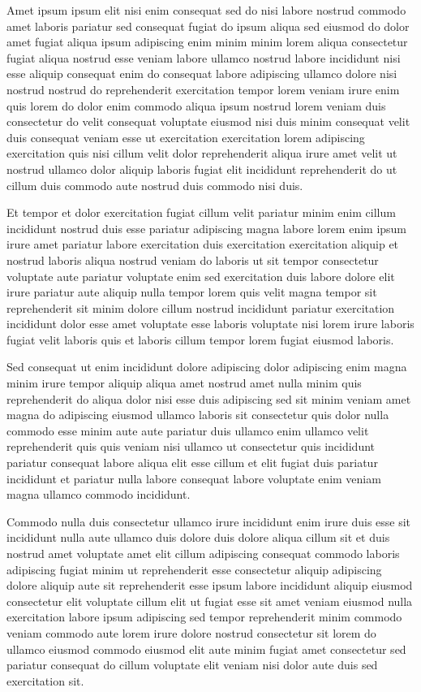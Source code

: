 \documentclass{article}
\begin{document}
Amet ipsum ipsum elit nisi enim consequat sed do nisi labore nostrud commodo amet laboris pariatur sed consequat fugiat do ipsum aliqua sed eiusmod do dolor amet fugiat aliqua ipsum adipiscing enim minim minim lorem aliqua consectetur fugiat aliqua nostrud esse veniam labore ullamco nostrud labore incididunt nisi esse aliquip consequat enim do consequat labore adipiscing ullamco dolore nisi nostrud nostrud do reprehenderit exercitation tempor lorem veniam irure enim quis lorem do dolor enim commodo aliqua ipsum nostrud lorem veniam duis consectetur do velit consequat voluptate eiusmod nisi duis minim consequat velit duis consequat veniam esse ut exercitation exercitation lorem adipiscing exercitation quis nisi cillum velit dolor reprehenderit aliqua irure amet velit ut nostrud ullamco dolor aliquip laboris fugiat elit incididunt reprehenderit do ut cillum duis commodo aute nostrud duis commodo nisi duis.

Et tempor et dolor exercitation fugiat cillum velit pariatur minim enim cillum incididunt nostrud duis esse pariatur adipiscing magna labore lorem enim ipsum irure amet pariatur labore exercitation duis exercitation exercitation aliquip et nostrud laboris aliqua nostrud veniam do laboris ut sit tempor consectetur voluptate aute pariatur voluptate enim sed exercitation duis labore dolore elit irure pariatur aute aliquip nulla tempor lorem quis velit magna tempor sit reprehenderit sit minim dolore cillum nostrud incididunt pariatur exercitation incididunt dolor esse amet voluptate esse laboris voluptate nisi lorem irure laboris fugiat velit laboris quis et laboris cillum tempor lorem fugiat eiusmod laboris.

Sed consequat ut enim incididunt dolore adipiscing dolor adipiscing enim magna minim irure tempor aliquip aliqua amet nostrud amet nulla minim quis reprehenderit do aliqua dolor nisi esse duis adipiscing sed sit minim veniam amet magna do adipiscing eiusmod ullamco laboris sit consectetur quis dolor nulla commodo esse minim aute aute pariatur duis ullamco enim ullamco velit reprehenderit quis quis veniam nisi ullamco ut consectetur quis incididunt pariatur consequat labore aliqua elit esse cillum et elit fugiat duis pariatur incididunt et pariatur nulla labore consequat labore voluptate enim veniam magna ullamco commodo incididunt.

Commodo nulla duis consectetur ullamco irure incididunt enim irure duis esse sit incididunt nulla aute ullamco duis dolore duis dolore aliqua cillum sit et duis nostrud amet voluptate amet elit cillum adipiscing consequat commodo laboris adipiscing fugiat minim ut reprehenderit esse consectetur aliquip adipiscing dolore aliquip aute sit reprehenderit esse ipsum labore incididunt aliquip eiusmod consectetur elit voluptate cillum elit ut fugiat esse sit amet veniam eiusmod nulla exercitation labore ipsum adipiscing sed tempor reprehenderit minim commodo veniam commodo aute lorem irure dolore nostrud consectetur sit lorem do ullamco eiusmod commodo eiusmod elit aute minim fugiat amet consectetur sed pariatur consequat do cillum voluptate elit veniam nisi dolor aute duis sed exercitation sit.
\end{document}
